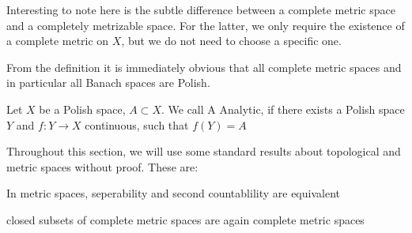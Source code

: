 \documentclass[10pt, a4paper, titlepage]{article}
\numberwithin{equation}{section}
\begin{document}
\begin{remark}
	
Interesting to note here is the subtle difference between a complete metric space and a completely metrizable space.
For the latter, we only require the existence of a complete metric on $X$, but we do not need to choose a specific one.
\end{remark}

From the definition it is immediately obvious that all complete metric spaces and in particular all Banach spaces are Polish.

\begin{definition}
	Let $X$ be a Polish space, $A \subset X$. We call A Analytic, if there exists a Polish space $Y$ and  $f:Y \to X$ continuous, such that  $f(Y) = A$

\end{definition}

Throughout this section, we will use some standard results about topological and metric spaces without proof. These are:
\begin{corollary}
	\label{second_countable}
	In metric spaces, seperability and second countablility are equivalent \cite{kaplansky2001}
\end{corollary}
\begin{corollary}
	\label{closed_cc}
	closed subsets of complete metric spaces are again complete metric spaces \cite{kaplansky2001}
\end{corollary}

\begin{theorem}
	
\end{theorem}
\end{document}
